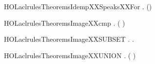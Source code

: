 \newcommand{\HOLaclrulesTheoremseqsXXEq}{\UseVerbatim{HOLaclrulesTheoremseqsXXEq}}
\begin{SaveVerbatim}{HOLaclrulesTheoremsIdempXXSpeaksXXFor}
\HOLTokenTurnstile{} \HOLSymConst{\HOLTokenForall{}}   . (\HOLSymConst{,}\HOLSymConst{,})    
\end{SaveVerbatim}
\newcommand{\HOLaclrulesTheoremsIdempXXSpeaksXXFor}{\UseVerbatim{HOLaclrulesTheoremsIdempXXSpeaksXXFor}}
\begin{SaveVerbatim}{HOLaclrulesTheoremsImageXXcmp}
\HOLTokenTurnstile{} \HOLSymConst{\HOLTokenForall{}}   . (  )  \HOLConst{\HOLTokenSubset{}}  \HOLSymConst{\HOLTokenEquiv{}}   \HOLConst{\HOLTokenSubset{}} \HOLTokenLeftbrace{} \HOLTokenBar{}   \HOLConst{\HOLTokenSubset{}} \HOLTokenRightbrace{}
\end{SaveVerbatim}
\newcommand{\HOLaclrulesTheoremsImageXXcmp}{\UseVerbatim{HOLaclrulesTheoremsImageXXcmp}}
\begin{SaveVerbatim}{HOLaclrulesTheoremsImageXXSUBSET}
\HOLTokenTurnstile{} \HOLSymConst{\HOLTokenForall{}} .    \HOLSymConst{\HOLTokenImp{}} \HOLSymConst{\HOLTokenForall{}}.   \HOLConst{\HOLTokenSubset{}}  
\end{SaveVerbatim}
\newcommand{\HOLaclrulesTheoremsImageXXSUBSET}{\UseVerbatim{HOLaclrulesTheoremsImageXXSUBSET}}
\begin{SaveVerbatim}{HOLaclrulesTheoremsImageXXUNION}
\HOLTokenTurnstile{} \HOLSymConst{\HOLTokenForall{}}  . (  )  \HOLSymConst{=}   \HOLConst{\HOLTokenUnion{}}  
\end{SaveVerbatim}
